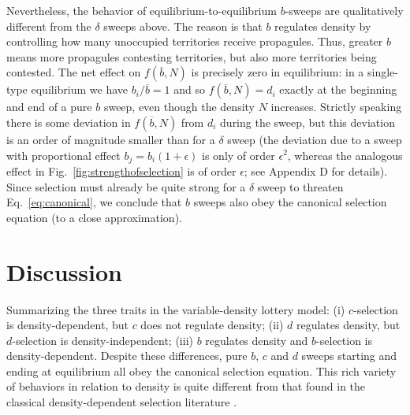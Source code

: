 \documentclass[12pt]{article}
\begin{document}
Nevertheless, the behavior of equilibrium-to-equilibrium $b$-sweeps are qualitatively different from the $\delta$ sweeps above. The reason is that $b$ regulates density by controlling how many unoccupied territories receive propagules. Thus, greater $b$ means more propagules contesting territories, but also more territories being contested. The net effect on $f(\overline{b},N)$ is precisely zero in equilibrium: in a single-type equilibrium we have $b_i/\overline{b}=1$ and so $f(\overline{b},N)=d_i$ exactly at the beginning and end of a pure $b$ sweep, even though the density $N$ increases. Strictly speaking there is some deviation in $f(\overline{b},N)$ from $d_i$ during the sweep, but this deviation is an order of magnitude smaller than for a $\delta$ sweep (the deviation due to a sweep with proportional effect $b_j= b_i(1+\epsilon)$ is only of order $\epsilon^2$, whereas the analogous effect in Fig.~\ref{fig:strengthofselection} is of order $\epsilon$; see Appendix D for details). Since selection must already be quite strong for a $\delta$ sweep to threaten Eq.~\eqref{eq:canonical}, we conclude that $b$ sweeps also obey the canonical selection equation (to a close approximation). 

\section*{Discussion}

Summarizing the three traits in the variable-density lottery model: (i) $c$-selection is density-dependent, but $c$ does not regulate density; (ii) $d$ regulates density, but $d$-selection is density-independent; (iii) $b$ regulates density and $b$-selection is density-dependent. Despite these differences, pure $b$, $c$ and $d$ sweeps starting and ending at equilibrium all obey the canonical selection equation. This rich variety of behaviors in relation to density is quite different from that found in the classical density-dependent selection literature \citep{roughgarden_1979,christiansen_2004}. 
\end{document}
